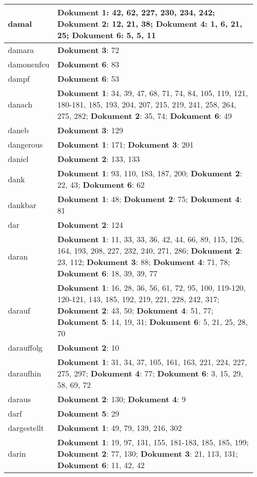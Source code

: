 \documentclass[a5paper]{article}
\begin{document}
\begin{longtable}[l]{|l|p{3in}|}
\hline
damal & \textbf{Dokument 1}: 42, 62, 227, 230, 234, 242; \textbf{Dokument 2}: 12, 21, 38; \textbf{Dokument 4}: 1, 6, 21, 25; \textbf{Dokument 6}: 5, 5, 11 \\
\hline
damara & \textbf{Dokument 3}: 72 \\
\hline
damonenfeu & \textbf{Dokument 6}: 83 \\
\hline
dampf & \textbf{Dokument 6}: 53 \\
\hline
danach & \textbf{Dokument 1}: 34, 39, 47, 68, 71, 74, 84, 105, 119, 121, 180-181, 185, 193, 204, 207, 215, 219, 241, 258, 264, 275, 282; \textbf{Dokument 2}: 35, 74; \textbf{Dokument 6}: 49 \\
\hline
daneb & \textbf{Dokument 3}: 129 \\
\hline
dangerous & \textbf{Dokument 1}: 171; \textbf{Dokument 3}: 201 \\
\hline
daniel & \textbf{Dokument 2}: 133, 133 \\
\hline
dank & \textbf{Dokument 1}: 93, 110, 183, 187, 200; \textbf{Dokument 2}: 22, 43; \textbf{Dokument 6}: 62 \\
\hline
dankbar & \textbf{Dokument 1}: 48; \textbf{Dokument 2}: 75; \textbf{Dokument 4}: 81 \\
\hline
dar & \textbf{Dokument 2}: 124 \\
\hline
daran & \textbf{Dokument 1}: 11, 33, 33, 36, 42, 44, 66, 89, 115, 126, 164, 193, 208, 227, 232, 240, 271, 286; \textbf{Dokument 2}: 23, 112; \textbf{Dokument 3}: 88; \textbf{Dokument 4}: 71, 78; \textbf{Dokument 6}: 18, 39, 39, 77 \\
\hline
darauf & \textbf{Dokument 1}: 16, 28, 36, 56, 61, 72, 95, 100, 119-120, 120-121, 143, 185, 192, 219, 221, 228, 242, 317; \textbf{Dokument 2}: 43, 50; \textbf{Dokument 4}: 51, 77; \textbf{Dokument 5}: 14, 19, 31; \textbf{Dokument 6}: 5, 21, 25, 28, 70 \\
\hline
darauffolg & \textbf{Dokument 2}: 10 \\
\hline
daraufhin & \textbf{Dokument 1}: 31, 34, 37, 105, 161, 163, 221, 224, 227, 275, 297; \textbf{Dokument 4}: 77; \textbf{Dokument 6}: 3, 15, 29, 58, 69, 72 \\
\hline
daraus & \textbf{Dokument 2}: 130; \textbf{Dokument 4}: 9 \\
\hline
darf & \textbf{Dokument 5}: 29 \\
\hline
dargestellt & \textbf{Dokument 1}: 49, 79, 139, 216, 302 \\
\hline
darin & \textbf{Dokument 1}: 19, 97, 131, 155, 181-183, 185, 185, 199; \textbf{Dokument 2}: 77, 130; \textbf{Dokument 3}: 21, 113, 131; \textbf{Dokument 6}: 11, 42, 42 \\

\end{longtable}
\end{document}
